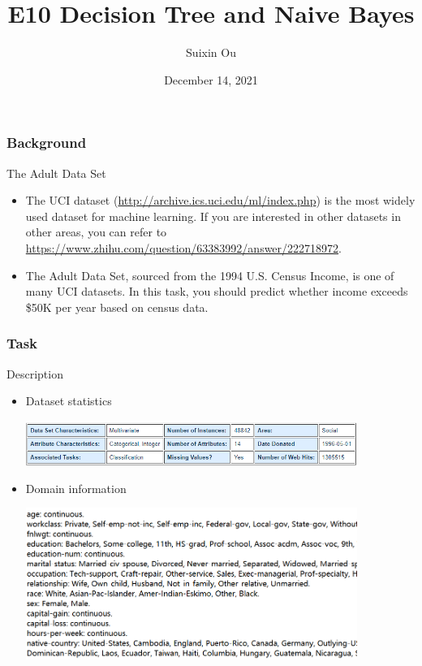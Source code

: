 \documentclass{beamer}
\title{E10 Decision Tree and Naive Bayes}
\author{Suixin Ou} %
\institute[SYSU] %
{
  School of Computer Science\\
  Sun Yat-sen University \\ %
  \medskip
}
\date{December 14, 2021} %
\begin{document}
\begin{frame}
  \titlepage
\end{frame}

\begin{frame}
  \frametitle{Background}
  \begin{block}{The Adult Data Set}
    \begin{itemize}
    \item 
The UCI dataset (\url{http://archive.ics.uci.edu/ml/index.php}) is the most widely used dataset for machine learning. If you are interested in other datasets in other areas, you can refer to \url{https://www.zhihu.com/question/63383992/answer/222718972}.

    \item The Adult Data Set, sourced from the 1994 U.S. Census Income, is one of many UCI datasets. In this task, you should predict whether income exceeds \$50K per year based on census data.
    \end{itemize}
      
  \end{block}
\end{frame}



\begin{frame}
  \frametitle{Task}
  \begin{block}{Description}
	
    \begin{itemize}
      \item Dataset statistics

\includegraphics[width=0.85\textwidth]{Pic/dataset}
      \item Domain information

\includegraphics[width=0.85\textwidth]{Pic/domain}
    \end{itemize}

  \end{block}
\end{frame}
\end{document}
